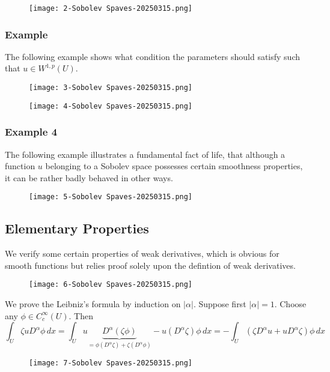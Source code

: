 \begin{figure}[H]
\centering
\texttt{[image: 2-Sobolev Spaves-20250315.png]}
\label{}
\end{figure}

\subsubsection{Example}

The following example shows what condition the parameters should satisfy such that $u\in W^{1,p}(U)$.

\begin{figure}[H]
\centering
\texttt{[image: 3-Sobolev Spaves-20250315.png]}
\label{}
\end{figure}
\begin{figure}[H]
\centering
\texttt{[image: 4-Sobolev Spaves-20250315.png]}
\label{}
\end{figure}

\subsubsection{Example 4}

The following example illustrates a fundamental fact of life, that although a function $u$ belonging to a Sobolev space possesses certain smoothness properties, it can be rather badly behaved in other ways.

\begin{figure}[H]
\centering
\texttt{[image: 5-Sobolev Spaves-20250315.png]}
\label{}
\end{figure}

\subsection{Elementary Properties}

We verify some certain properties of weak derivatives, which is obvious for smooth functions but relies proof solely upon the defintion of weak derivatives.

\begin{figure}[H]
\centering
\texttt{[image: 6-Sobolev Spaves-20250315.png]}
\label{}
\end{figure}

We prove the Leibniz's formula by induction on $\lvert \alpha \rvert$. Suppose first $\lvert \alpha \rvert=1$. Choose any $\phi\in C^{\infty}_{c}(U)$. Then
\[
\int_{U}^{}  \zeta uD^{\alpha}\phi \, dx  = \int_{U}^{} u\underbrace{ D^{\alpha}(\zeta \phi) }_{ =\phi (D^{\alpha}\zeta) +\zeta (D^{\alpha}\phi)}-u(D^{\alpha}\zeta)\phi \, dx 
  =-\int_{U}^{} (\zeta D^{\alpha}u+uD^{\alpha}\zeta)\phi \, dx 
\]
\begin{figure}[H]
\centering
\texttt{[image: 7-Sobolev Spaves-20250315.png]}
\label{}
\end{figure}

